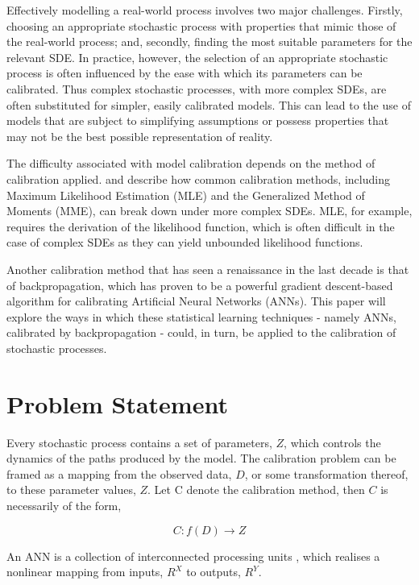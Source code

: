 \documentclass[11pt,oneside,openany,a4paper,english, report, goldenblock
]{usthesis}
\begin{document}
Effectively modelling a real-world process involves two major challenges. Firstly, choosing an appropriate stochastic process with properties that mimic those of the real-world process; and, secondly, finding the most suitable parameters for the relevant SDE. In practice, however, the selection of an appropriate stochastic process is often influenced by the ease with which its parameters can be calibrated. Thus complex stochastic processes, with more complex SDEs, are often substituted for simpler, easily calibrated models. This can lead to the use of models that are subject to simplifying assumptions or possess properties that may not be the best possible representation of reality.


The difficulty associated with model calibration depends on the method of calibration applied. \citet{Mongwe} and \citet{Honore} describe how common calibration methods, including Maximum Likelihood Estimation (MLE) and the Generalized Method of Moments (MME), can break down under more complex SDEs. MLE, for example, requires the derivation of the likelihood function, which is often difficult in the case of complex SDEs as they can yield unbounded likelihood functions.


Another calibration method that has seen a renaissance in the last decade is that of backpropagation, which has proven to be a powerful gradient descent-based algorithm for calibrating Artificial Neural Networks (ANNs). 
This paper will explore the ways in which these statistical learning techniques - namely ANNs, calibrated by backpropagation - could, in turn, be applied to the calibration of stochastic processes.



\section{Problem Statement}
Every stochastic process contains a set of parameters, $ Z $, which controls the dynamics of the paths produced by the model. The calibration problem can be framed as a mapping from the observed data, $ D $, or some transformation thereof, to these parameter values, $ Z $. Let C denote the calibration method, then $C$ is necessarily of the form,

\begin{equation}
C:f \left( D \right) \rightarrow Z
\end{equation}

An ANN is a collection of interconnected processing units \citep{Teugels}, which realises a nonlinear mapping from inputs, $ R^X $ to outputs, $ R^Y $.
\end{document}
